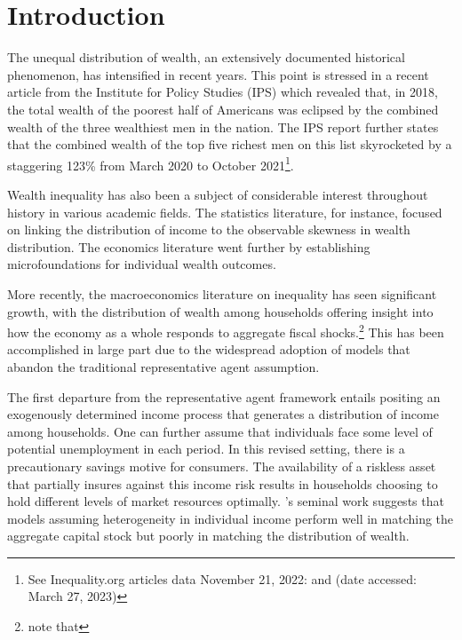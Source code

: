 \documentclass[\econtexRoot/Chp1proposal]{subfiles}
\begin{document}
\hypertarget{Introduction}{}
\section{Introduction}\notinsubfile{\label{sec:intro}}
\setcounter{page}{0}


\par The unequal distribution of wealth, an extensively documented historical phenomenon, has intensified in recent years. This point is stressed in a recent article from the Institute for Policy Studies (IPS) which revealed that, in 2018, the total wealth of the poorest half of Americans was eclipsed by the combined wealth of the three wealthiest men in the nation. The IPS report further states that the combined wealth of the top five richest men on this list skyrocketed by a staggering 123\% from March 2020 to October 2021\footnote{See Inequality.org articles data November 21, 2022:  and  (date accessed: March 27, 2023)}.

\par Wealth inequality has also been a subject of considerable interest throughout history in various academic fields. The statistics literature, for instance, focused on linking the distribution of income to the observable skewness in wealth distribution. The economics literature went further by establishing microfoundations for individual wealth outcomes.

\par More recently, the macroeconomics literature on inequality has seen significant growth, with the distribution of wealth among households offering insight into how the economy as a whole responds to aggregate fiscal shocks.\footnote{\cite{jpjsledj2022} note that } This has been accomplished in large part due to the widespread adoption of models that abandon the traditional representative agent assumption. 

\par The first departure from the representative agent framework entails positing an exogenously determined income process that generates a distribution of income among households. One can further assume that individuals face some level of potential unemployment in each period. In this revised setting, there is a precautionary savings motive for consumers. The availability of a riskless asset that partially insures against this income risk results in households choosing to hold different levels of market resources optimally. \cite{ks1998}'s seminal work suggests that models assuming heterogeneity in individual income perform well in matching the aggregate capital stock but poorly in matching the distribution of wealth. 
\end{document}
